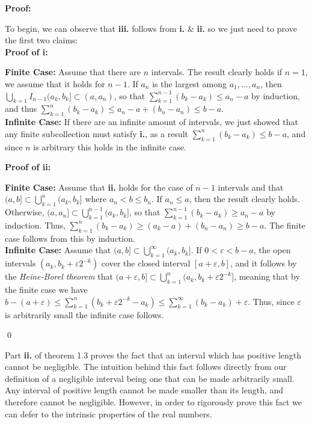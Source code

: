 \textbf{Proof:}
\begin{proofline}
	To begin, we can observe that \textbf{iii.} follows from \textbf{i.} \& \textbf{ii.} so we just need to prove the first two claims:\\
	{\footnotesize \textbf{Proof of i:}}
	\vspace{-1.5ex}
	\begin{proofline}[1em]
		{\footnotesize \textbf{Finite Case:}} Assume that there are $n$ intervals. The result clearly holds if $n=1$, we assume that it holds for $n-1$. If $a_n$ is the largest among $a_1,...,a_n$, then $\bigcup_{k=1} I_{n-1}(a_k, b_k] \subset (a, a_n)$, so that $\sum_{k=1}^{n-1}(b_k-a_k) \leq a_n -a $ by induction, and thus $\sum_{k=1}^{n}(b_k-a_k) \leq a_n -a + (b_n-a_n) \leq b-a$.\\[5pt]
		{\footnotesize \textbf{Infinite Case:}} If there are an infinite amount of intervals, we just showed that any finite subcollection must satisfy \textbf{i.}, as a result $\sum_{k=1}^{n}(b_k-a_k) \leq b-a$, and since $n$ is arbitrary this holds in the infinite case.
	\end{proofline}
	    
	{\footnotesize \textbf{Proof of ii:}}
	\vspace{-1.5ex}
	\begin{proofline}[1em]
		{\footnotesize \textbf{Finite Case:}} Assume that \textbf{ii.} holds for the case of $n-1$ intervals and that $(a,b] \subset \bigcup_{k=1}^n(a_k,b_k]$ where $a_n < b \leq b_n$. If $a_n \leq a$, then the result clearly holds. Otherwise, $(a,a_n] \subset \bigcup_{k=1}^{n-1}(a_k, b_k]$, so that $\sum_{k=1}^{n-1}(b_k-a_k) \geq a_n - a$ by induction. Thus, $\sum_{k=1}^n(b_k-a_k) \geq (a_k-a)+(b_n-a_n) \geq b-a$. The finite case follows from this by induction.\\[5pt]
		{\footnotesize \textbf{Infinite Case:}} Assume that  $(a,b] \subset \bigcup_{k=1}^{\infty}(a_k, b_k]$. If $0 < \varepsilon < b - a$, the open intervals $(a_k, b_k + \varepsilon2^{-k})$ cover the closed interval $[a + \varepsilon, b]$, and it follows by the \textit{Heine-Borel theorem} that $(a + \varepsilon, b] \subset \bigcup_{k=1}^n(a_k, b_k + \varepsilon2^{-k}]$, meaning that by the finite case we have $b - (a + \varepsilon) \leq \sum_{k=1}^n(b_k + \varepsilon 2^{-k}-a_k) \leq \sum_{k=1}^{\infty}(b_k-a_k) + \varepsilon$. Thus, since $\varepsilon$ is arbitrarily small the infinite case follows.
			\end{proofline}
			\vspace{-4ex}
			\hfill \qed
			\end{proofline}
			Part \textbf{ii.} of theorem 1.3 proves the fact that an interval which has  positive length cannot be negligible. The intuition behind this fact follows directly from our definition of a negligible interval being one that can be made arbitrarily small. Any interval of positive length cannot be made smaller than its length, and therefore cannot be negligible. However, in order to rigorously prove this fact we can defer to the intrinsic properties of the real numbers.
			
			
			
